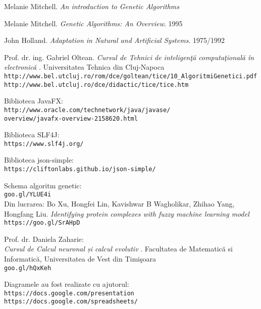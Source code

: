 \begin{thebibliography}{99}

Melanie Mitchell.
\textit{An introduction to Genetic Algorithms}

Melanie Mitchell. 
\textit{Genetic Algorithms: An Overview}. 1995

John Holland. 
\textit{Adaptation in Natural and Artificial Systems}. 1975/1992

Prof. dr. ing. Gabriel Oltean.
\textit{Cursul de Tehnici de inteligenţă computaţională în electronică}
. Universitatea Tehnica din Cluj-Napoca
\\\texttt{http://www.bel.utcluj.ro/rom/dce/goltean/tice/10\_AlgoritmiGenetici.pdf}
\\\texttt{http://www.bel.utcluj.ro/dce/didactic/tice/tice.htm}

Biblioteca JavaFX:\\
\texttt{http://www.oracle.com/technetwork/java/javase/}\\
\texttt{overview/javafx-overview-2158620.html}

Biblioteca SLF4J:\\
\texttt{https://www.slf4j.org/}

Biblioteca json-simple:\\
\texttt{https://cliftonlabs.github.io/json-simple/}

Schema algoritm genetic:
\\\texttt{goo.gl/YLUE4i}\\
Din lucrarea: Bo Xu, Hongfei Lin, Kavishwar B Wagholikar, Zhihao Yang, Hongfang Liu. \textit{Identifying protein complexes with fuzzy machine learning model}
\\\texttt{https://goo.gl/SrAHpD} 

Prof. dr. Daniela Zaharie:\\
\textit{Cursul de Calcul neuronal și calcul evolutiv}
. Facultatea de Matematică si Informatică, Universitatea de Vest din Timişoara
\\\texttt{goo.gl/hQxKeh}

 Diagramele au fost realizate cu ajutorul:
\\\texttt{https://docs.google.com/presentation}
\\\texttt{https://docs.google.com/spreadsheets/}

\end{thebibliography}
